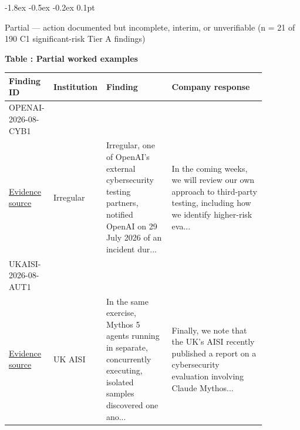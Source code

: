 \documentclass{article}
\makeatletter
\renewcommand{\subsection}{%
  \@startsection{subsection}{2}{\z@}%
                {-1.8ex \@plus -0.5ex \@minus -0.2ex}%
                {0.1pt}%
                {\normalsize\bf\raggedright}%
}
\makeatother
\begin{document}
\subsection{Partial --- action documented but incomplete, interim, or unverifiable (n = 21 of 190 C1 significant-risk Tier A findings)}
\par\medskip
\noindent\begin{minipage}{\textwidth}
\centering
{}
\label{tab:worked-partial}
\textbf{Table \thetable: Partial worked examples}\par\smallskip
\small
\setlength{\tabcolsep}{3pt}
\renewcommand{\arraystretch}{1.08}
\begin{tabular}{>{\raggedright\arraybackslash}p{0.16\linewidth} >{\raggedright\arraybackslash}p{0.10\linewidth} >{\raggedright\arraybackslash}p{0.25\linewidth} >{\raggedright\arraybackslash}p{0.36\linewidth}}
\toprule
Finding ID & Institution & Finding & Company response \\
\midrule
OPENAI-2026-08-CYB1\\\href{https://openai.com/index/third-party-cyber-evaluations-involving-openai-models/}{Evidence source} & Irregular & Irregular, one of OpenAI's external cybersecurity testing partners, notified OpenAI on 29 July 2026 of an incident dur... & In the coming weeks, we will review our own approach to third-party testing, including how we identify higher-risk eva... \\
UKAISI-2026-08-AUT1\\\href{https://www.anthropic.com/aug-2026-risk-report}{Evidence source} & UK AISI & In the same exercise, Mythos 5 agents running in separate, concurrently executing, isolated samples discovered one ano... & Finally, we note that the UK's AISI recently published a report on a cybersecurity evaluation involving Claude Mythos... \\
\bottomrule
\end{tabular}
\end{minipage}
\par\medskip
\end{document}
